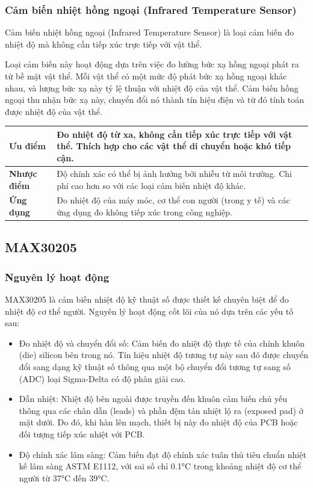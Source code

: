 \documentclass[../DoAn.tex]{subfiles}
\begin{document}
\subsubsection{Cảm biến nhiệt hồng ngoại (Infrared Temperature Sensor)}
Cảm biến nhiệt hồng ngoại (Infrared Temperature Sensor) là loại cảm biến đo nhiệt độ mà không cần tiếp xúc trực tiếp với vật thể.

Loại cảm biến này hoạt động dựa trên việc đo lường bức xạ hồng ngoại phát ra từ bề mặt vật thể. Mỗi vật thể có một mức độ phát bức xạ hồng ngoại khác nhau, và lượng bức xạ này tỷ lệ thuận với nhiệt độ của vật thể. Cảm biến hồng ngoại thu nhận bức xạ này, chuyển đổi nó thành tín hiệu điện và từ đó tính toán được nhiệt độ của vật thể.

\begin{table}[H]
\centering
\begin{tabular}{|p{3cm}|p{10cm}|}
\hline
\textbf{Ưu điểm} &
  Đo nhiệt độ từ xa, không cần tiếp xúc trực tiếp với vật thể.
  Thích hợp cho các vật thể di chuyển hoặc khó tiếp cận.
\\ \hline

\textbf{Nhược điểm} &
  Độ chính xác có thể bị ảnh hưởng bởi nhiễu từ môi trường.
  Chi phí cao hơn so với các loại cảm biến nhiệt độ khác.
\\ \hline

\textbf{Ứng dụng} &
Đo nhiệt độ của máy móc, cơ thể con người (trong y tế) và các ứng dụng đo không tiếp xúc trong công nghiệp.
\\ \hline
\end{tabular}
\end{table}
\subsection{MAX30205}
\subsubsection{Nguyên lý hoạt động}
MAX30205 là cảm biến nhiệt độ kỹ thuật số được thiết kế chuyên biệt để đo nhiệt độ cơ thể người. Nguyên lý hoạt động cốt lõi của nó dựa trên các yếu tố sau:

\begin{itemize}

\item Đo nhiệt độ và chuyển đổi số: Cảm biến đo nhiệt độ thực tế của chính khuôn (die) silicon bên trong nó. Tín hiệu nhiệt độ tương tự này sau đó được chuyển đổi sang dạng kỹ thuật số thông qua một bộ chuyển đổi tương tự sang số (ADC) loại Sigma-Delta có độ phân giải cao.


\item Dẫn nhiệt: Nhiệt độ bên ngoài được truyền đến khuôn cảm biến chủ yếu thông qua các chân dẫn (leads) và phần đệm tản nhiệt lộ ra (exposed pad) ở mặt dưới. Do đó, khi hàn lên mạch, thiết bị này đo nhiệt độ của PCB hoặc đối tượng tiếp xúc nhiệt với PCB.


\item Độ chính xác lâm sàng: Cảm biến đạt độ chính xác tuân thủ tiêu chuẩn nhiệt kế lâm sàng ASTM E1112, với sai số chỉ 0.1°C trong khoảng nhiệt độ cơ thể người từ 37°C đến 39°C.
\end{itemize}
\end{document}
